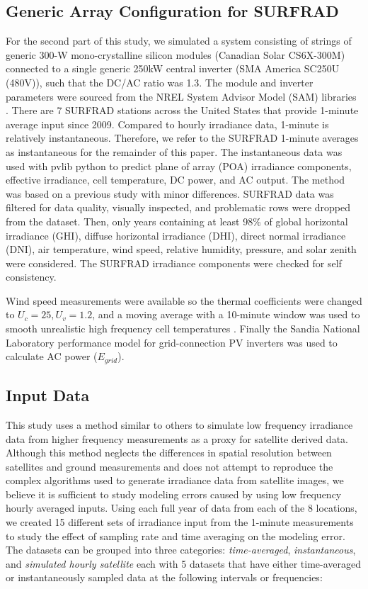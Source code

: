 \documentclass[conference]{IEEEtran}
\begin{document}
\subsection{Generic Array Configuration for SURFRAD}
For the second part of this study, we simulated a system consisting of strings of generic 300-W mono-crystalline silicon modules (Canadian Solar CS6X-300M) connected to a single generic 250kW central inverter (SMA America SC250U (480V)), such that the DC/AC ratio was 1.3. The module and inverter parameters were sourced from the NREL System Advisor Model (SAM) libraries \cite{Freeman2018}. There are 7 SURFRAD \cite{Augustine2000} stations across the United States that provide 1-minute average input since 2009. Compared to hourly irradiance data, 1-minute is relatively instantaneous. Therefore, we refer to the SURFRAD 1-minute averages as instantaneous for the remainder of this paper. The instantaneous data was used with pvlib python \cite{pvlib2018} to predict plane of array (POA) irradiance components, effective irradiance, cell temperature, DC power, and AC output. The method was based on a previous study \cite{9519024} with minor differences. SURFRAD data was filtered for data quality, visually inspected, and problematic rows were dropped from the dataset. Then, only years containing at least 98\% of global horizontal irradiance (GHI), diffuse horizontal irradiance (DHI), direct normal irradiance (DNI), air temperature, wind speed, relative humidity, pressure, and solar zenith were considered. The SURFRAD irradiance components were checked for self consistency.

Wind speed measurements were available so the thermal coefficients were changed to $U_c=25, U_v=1.2$, and a moving average with a 10-minute window was used to smooth unrealistic high frequency cell temperatures \cite{9095219}. Finally the Sandia National Laboratory performance model for grid-connection PV inverters \cite{King2007} was used to calculate AC power ($E_{grid}$).

\subsection{Input Data}
This study uses a method similar to others to simulate low frequency irradiance data from higher frequency measurements \cite{Bowersox2021,osti_1797569} as a proxy for satellite derived data. Although this method neglects the differences in spatial resolution between satellites and ground measurements and does not attempt to reproduce the complex algorithms used to generate irradiance data from satellite images, we believe it is sufficient to study modeling errors caused by using low frequency hourly averaged inputs. Using each full year of data from each of the 8 locations, we created 15 different sets of irradiance input from the 1-minute measurements to study the effect of sampling rate and time averaging on the modeling error. The datasets can be grouped into three categories: \emph{time-averaged}, \emph{instantaneous}, and \emph{simulated hourly satellite} each with 5 datasets that have either time-averaged or instantaneously sampled data at the following intervals or frequencies:
\end{document}
